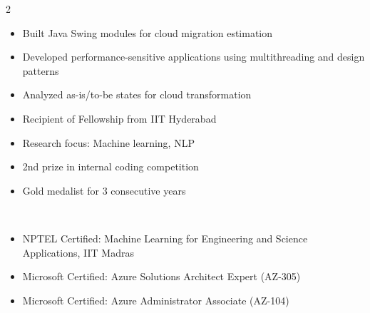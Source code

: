 \documentclass[10pt,a4paper,ragged2e,withhyper]{altacv}
\begin{document}
\begin{paracol}{2}
\begin{itemize}
\item Built Java Swing modules for cloud migration estimation
\item Developed performance-sensitive applications using multithreading and design patterns
\item Analyzed as-is/to-be states for cloud transformation
\end{itemize}

\switchcolumn%

\begin{itemize}
\item Recipient of Fellowship from IIT Hyderabad
\item Research focus: Machine learning, NLP
\end{itemize}
\divider%

\begin{itemize}
\item 2nd prize in internal coding competition
\end{itemize}
\divider%

\begin{itemize}
\item Gold medalist for 3 consecutive years
\end{itemize}



\raggedright%
\\

\begin{itemize}
\item NPTEL Certified: Machine Learning for Engineering and Science Applications, IIT Madras
\item Microsoft Certified: Azure Solutions Architect Expert (AZ-305)
\item Microsoft Certified: Azure Administrator Associate (AZ-104)
\end{itemize}


\end{paracol}
\end{document}
